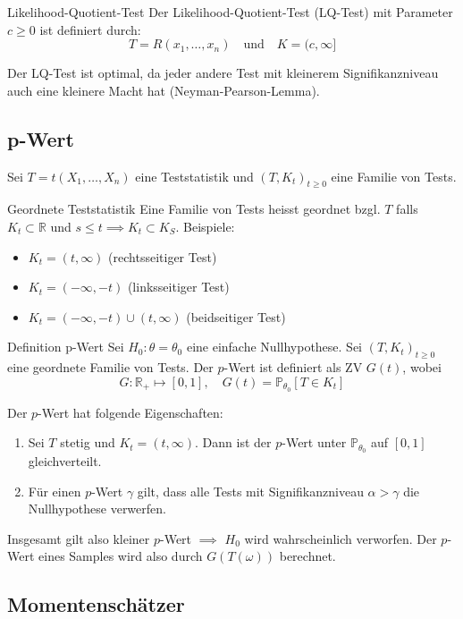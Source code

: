 \documentclass[a4paper,10pt]{article}
\def\R{\mathbb{R}}
\def\P{\mathbb{P}}
\begin{document}
\begin{subbox}{Likelihood-Quotient-Test}
	Der Likelihood-Quotient-Test (LQ-Test) mit Parameter \(c \ge 0\) ist definiert durch:
	\[T = R(x_1, \ldots, x_n) \quad \text{und} \quad K = (c, \infty]\]
\end{subbox}
Der LQ-Test ist optimal, da jeder andere Test mit kleinerem Signifikanzniveau auch eine kleinere Macht hat (Neyman-Pearson-Lemma).

\subsection{p-Wert}
Sei \(T = t(X_1, \ldots, X_n)\) eine Teststatistik und \((T,K_t)_{t\ge 0}\) eine Familie von Tests.

\begin{subbox}{Geordnete Teststatistik}
	Eine Familie von Tests heisst geordnet bzgl. \(T\) falls \(K_t \subset \R\) und \(s \le t \implies K_t \subset K_S\). Beispiele:
	\begin{itemize}
		\item \(K_t = (t, \infty)\) (rechtsseitiger Test)
		\item \(K_t = (-\infty, -t)\) (linksseitiger Test)
		\item \(K_t = (-\infty, -t) \cup (t, \infty)\) (beidseitiger Test)
	\end{itemize}
\end{subbox}

\begin{mainbox}{Definition p-Wert}
	Sei \(H_0: \theta = \theta_0\) eine einfache Nullhypothese. Sei \((T, K_t)_{t\ge 0}\) eine geordnete Familie von Tests. Der \(p\)-Wert ist definiert als ZV \(G(t)\), wobei
	\[G: \R_+ \mapsto [0,1], \quad G(t) = \P_{\theta_0}[T \in K_t]\]
\end{mainbox}
Der \(p\)-Wert hat folgende Eigenschaften:
\begin{enumerate}
	\item Sei \(T\) stetig und \(K_t = (t, \infty)\). Dann ist der \(p\)-Wert unter \(\P_{\theta_0}\) auf \([0,1]\) gleichverteilt.
	\item Für einen \(p\)-Wert \(\gamma\) gilt, dass alle Tests mit Signifikanzniveau \(\alpha > \gamma\) die Nullhypothese verwerfen.
\end{enumerate}

Insgesamt gilt also kleiner $p$-Wert $\implies$ $H_0$ wird wahrscheinlich verworfen. Der $p$-Wert eines Samples wird also durch $G(T(\omega))$ berechnet.

\subsection{Momentenschätzer}
\end{document}
